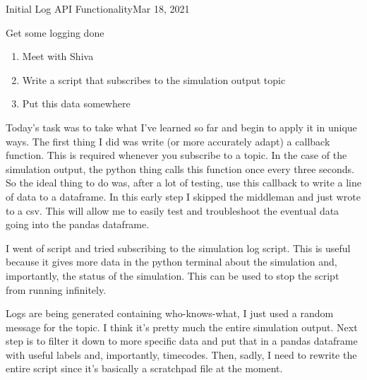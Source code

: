 \begin{entry}{Initial Log API Functionality}{Mar 18, 2021}
    \objective 
    
    Get some logging done
    
    \outline
    
    \begin{enumerate}
        \item Meet with Shiva
        \item Write a script that subscribes to the simulation output topic
        \item Put this data somewhere
    \end{enumerate}
    
    \procedures
    
    Today's task was to take what I've learned so far and begin to apply it in unique ways. The first thing I did was
    write (or more accurately adapt) a callback function. This is required whenever you subscribe to a topic. In the
    case of the simulation output, the python thing calls this function once every three seconds. So the ideal thing
    to do was, after a lot of testing, use this callback to write a line of data to a dataframe. In this early step
    I skipped the middleman and just wrote to a csv. This will allow me to easily test and troubleshoot the eventual
    data going into the pandas dataframe.

    I went of script and tried subscribing to the simulation log script. This is useful because it gives more data in
    the python terminal about the simulation and, importantly, the status of the simulation. This can be used to stop
    the script from running infinitely.


    \results
    
    Logs are being generated containing who-knows-what, I just used a random message for the topic. I think it's
    pretty much the entire simulation output. Next step is to filter it down to more specific data and put that in a
    pandas dataframe with useful labels and, importantly, timecodes. Then, sadly, I need to rewrite the entire script
    since it's basically a scratchpad file at the moment.
    
\end{entry}